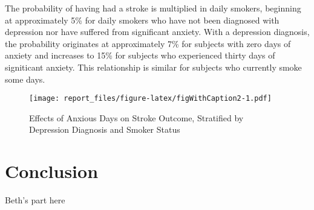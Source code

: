 \documentclass[11pt,]{article}
\begin{document}
The probability of having had a stroke is multiplied in daily smokers,
beginning at approximately 5\% for daily smokers who have not been
diagnosed with depression nor have suffered from significant anxiety.
With a depression diagnosis, the probability originates at approximately
7\% for subjects with zero days of anxiety and increases to 15\% for
subjects who experienced thirty days of signiticant anxiety. This
relationship is similar for subjects who currently smoke some days.

\begin{figure}
\centering
\texttt{[image: report\_files/figure-latex/figWithCaption2-1.pdf]}
\caption{Effects of Anxious Days on Stroke Outcome, Stratified by
Depression Diagnosis and Smoker Status}
\end{figure}

\hypertarget{conclusion}{%
\section{Conclusion}\label{conclusion}}

Beth's part here




\newpage
\singlespacing 

\end{document}
